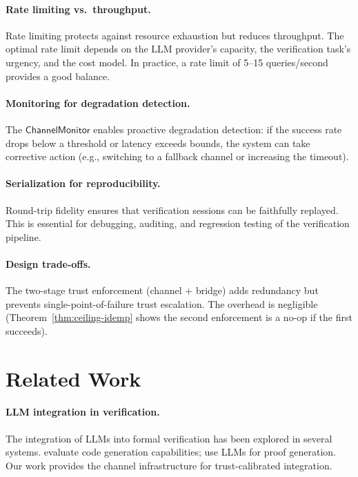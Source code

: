 \documentclass[11pt]{article}
\newcommand{\ChanMon}{\mathsf{ChannelMonitor}}
\begin{document}
\paragraph{Rate limiting vs.\ throughput.}
Rate limiting protects against resource exhaustion but reduces
throughput.  The optimal rate limit depends on the LLM provider's
capacity, the verification task's urgency, and the cost model.
In practice, a rate limit of 5--15 queries/second provides a
good balance.

\paragraph{Monitoring for degradation detection.}
The $\ChanMon$ enables proactive degradation detection: if the
success rate drops below a threshold or latency exceeds bounds,
the system can take corrective action (e.g., switching to a
fallback channel or increasing the timeout).

\paragraph{Serialization for reproducibility.}
Round-trip fidelity ensures that verification sessions can be
faithfully replayed.  This is essential for debugging, auditing,
and regression testing of the verification pipeline.

\paragraph{Design trade-offs.}
The two-stage trust enforcement (channel + bridge) adds
redundancy but prevents single-point-of-failure trust escalation.
The overhead is negligible (Theorem~\ref{thm:ceiling-idemp}
shows the second enforcement is a no-op if the first succeeds).

\section{Related Work}
\label{sec:related}

\paragraph{LLM integration in verification.}
The integration of LLMs into formal verification has been explored
in several systems.  \citet{chen2021codex} evaluate code generation
capabilities; \citet{first2023baldur} use LLMs for proof generation.
Our work provides the channel infrastructure for trust-calibrated
integration.
\end{document}
